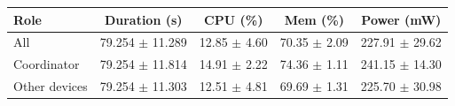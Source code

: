 \begin{tabular}{lcccc}
\hline
\textbf{Role} & \textbf{Duration (s)} & \textbf{CPU (\%)} & \textbf{Mem (\%)} & \textbf{Power (mW)} \\
\hline
All & 79.254 $\pm$ 11.289 & 12.85 $\pm$ 4.60 & 70.35 $\pm$ 2.09 & 227.91 $\pm$ 29.62 \\
Coordinator & 79.254 $\pm$ 11.814 & 14.91 $\pm$ 2.22 & 74.36 $\pm$ 1.11 & 241.15 $\pm$ 14.30 \\
Other devices & 79.254 $\pm$ 11.303 & 12.51 $\pm$ 4.81 & 69.69 $\pm$ 1.31 & 225.70 $\pm$ 30.98 \\
\hline
\end{tabular}
